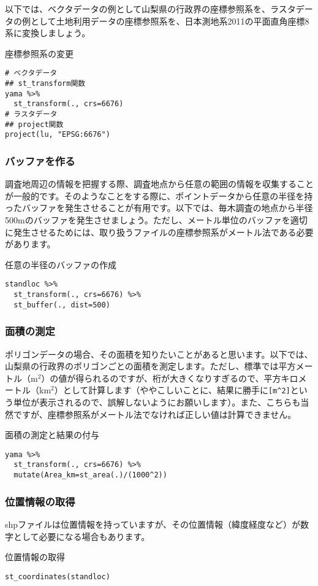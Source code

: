 以下では、ベクタデータの例として山梨県の行政界の座標参照系を、ラスタデータの例として土地利用データの座標参照系を、日本測地系2011の平面直角座標8系に変換しましょう。
\begin{itembox}[l]{座標参照系の変更}
\begin{verbatim}
# ベクタデータ
## st_transform関数
yama %>%
  st_transform(., crs=6676)
# ラスタデータ
## project関数
project(lu, "EPSG:6676")
\end{verbatim}
\end{itembox}

\subsubsection{バッファを作る}
調査地周辺の情報を把握する際、調査地点から任意の範囲の情報を収集することが一般的です。そのようなことをする際に、ポイントデータから任意の半径を持ったバッファを発生させることが有用です。以下では、毎木調査の地点から半径500mのバッファを発生させましょう。ただし、メートル単位のバッファを適切に発生させるためには、取り扱うファイルの座標参照系がメートル法である必要があります。
\begin{itembox}[l]{任意の半径のバッファの作成}
\begin{verbatim}
standloc %>%
  st_transform(., crs=6676) %>%
  st_buffer(., dist=500)
\end{verbatim}
\end{itembox}

\subsubsection{面積の測定}
ポリゴンデータの場合、その面積を知りたいことがあると思います。以下では、山梨県の行政界のポリゴンごとの面積を測定します。ただし、標準では平方メートル（m$^{2}$）の値が得られるのですが、桁が大きくなりすぎるので、平方キロメートル（km$^{2}$）として計算します（ややこしいことに、結果に勝手に\verb|[m^2]|という単位が表示されるので、誤解しないようにお願いします）。また、こちらも当然ですが、座標参照系がメートル法でなければ正しい値は計算できません。
\begin{itembox}[l]{面積の測定と結果の付与}
\begin{verbatim}
yama %>%
  st_transform(., crs=6676) %>%
  mutate(Area_km=st_area(.)/(1000^2))
\end{verbatim}
\end{itembox}

\subsubsection{位置情報の取得}
shpファイルは位置情報を持っていますが、その位置情報（緯度経度など）が数字として必要になる場合もあります。
\begin{itembox}[l]{位置情報の取得}
\begin{verbatim}
st_coordinates(standloc)
\end{verbatim}
\end{itembox}

